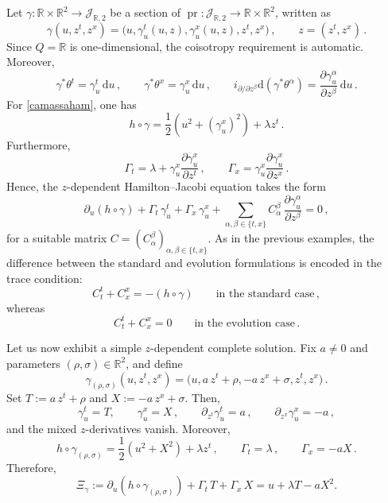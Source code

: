 \documentclass[11pt,twoside]{article}
\theoremstyle{plain}
\theoremstyle{definition}
\theoremstyle{remark}
\newcommand{\dd}{\mathrm{d}}
\renewcommand{\d}{\mathrm{d}}
\begin{document}
Let
\(
\gamma\colon \mathbb R\times\mathbb R^2\to \mathcal J_{\mathbb R,2}
\)
be a section of
\(
\operatorname{pr}\colon \mathcal J_{\mathbb R,2}\to \mathbb R\times\mathbb R^2
\),
written as
\begin{equation}\label{eq:wave_gamma_zdep}
\gamma(u,z^t,z^x)=\bigl(u,\gamma_u^t(u,z),\gamma_u^x(u,z),z^t,z^x\bigr)\,,
\qquad z=(z^t,z^x)\,.
\end{equation}
Since $Q=\mathbb R$ is one-dimensional, the coisotropy requirement is automatic. Moreover,
\[
\gamma^*\theta^t=\gamma_u^t\,\dd u\,,\qquad
\gamma^*\theta^x=\gamma_u^x\,\dd u\,,\qquad
i_{\partial/\partial z^\beta}\d(\gamma^*\theta^\alpha)
=
\frac{\partial\gamma_u^\alpha}{\partial z^\beta}\,\dd u\,.
\]
For \eqref{camassaham}, one has
\begin{equation}\label{eq:wave_h_gamma}
h\circ\gamma=\frac12\left(u^2+(\gamma_u^x)^2\right)+\lambda z^t\,.
\end{equation}
Furthermore,
\begin{equation}\label{eq:wave_Gamma_t}
\Gamma_t=\lambda+\gamma_u^x\frac{\partial\gamma_u^x}{\partial z^t}\,,
\qquad
\Gamma_x=\gamma_u^x\frac{\partial\gamma_u^x}{\partial z^x}\,.
\end{equation}
Hence, the $z$-dependent Hamilton--Jacobi equation takes the form
\begin{equation}\label{eq:wave_zdep_HJ}
\partial_u(h\circ\gamma)+\Gamma_t\,\gamma_u^t+\Gamma_x\,\gamma_u^x
+\sum_{\alpha,\beta\in\{t,x\}}C_\alpha^{\beta}\,\frac{\partial\gamma_u^\alpha}{\partial z^\beta}=0\,,
\end{equation}
for a suitable matrix $C=(C_\alpha^{\beta})_{\alpha,\beta\in\{t,x\}}$. As in the previous examples, the difference between the standard and evolution formulations is encoded in the trace condition:
\begin{equation}\label{eq:wave_trace_standard}
C_t^t+C_x^x=-(h\circ\gamma)
\qquad\text{in the standard case}\,,
\end{equation}
whereas
\begin{equation}\label{eq:wave_trace_evol}
C_t^t+C_x^x=0
\qquad\text{in the evolution case}\,.
\end{equation}

Let us now exhibit a simple $z$-dependent complete solution. Fix $a\neq0$ and parameters $(\rho,\sigma)\in\mathbb R^2$, and define
\begin{equation}\label{eq:wave_gamma_family}
\gamma_{(\rho,\sigma)}(u,z^t,z^x)=\bigl(u,a\,z^t+\rho,-a\,z^x+\sigma,z^t,z^x\bigr)\,.
\end{equation}
Set
$T:=a\,z^t+\rho$ and $X:=-a\,z^x+\sigma$.
Then,
\[
\gamma_u^t=T,\qquad \gamma_u^x=X\,,\qquad
\partial_{z^t}\gamma_u^t=a\,,\qquad
\partial_{z^x}\gamma_u^x=-a\,,
\]
and the mixed $z$-derivatives vanish. Moreover,
\[
h\circ\gamma_{(\rho,\sigma)}=\frac12(u^2+X^2)+\lambda z^t\,,
\qquad
\Gamma_t=\lambda\,,\qquad
\Gamma_x=-aX\,.
\]
Therefore,
\begin{equation}\label{eq:wave_Xi_gamma}
\Xi_\gamma:=\partial_u(h\circ\gamma_{(\rho,\sigma)})+\Gamma_t\,T+\Gamma_x\,X
=
u+\lambda T-aX^2.
\end{equation}
\end{document}

